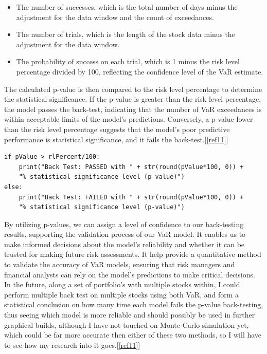 \documentclass{article}
\begin{document}
\begin{itemize}
    \item The number of successes, which is the total number of days minus the adjustment for the data window and the count of exceedances.
    \item The number of trials, which is the length of the stock data minus the adjustment for the data window.
    \item The probability of success on each trial, which is 1 minus the risk level percentage divided by 100, reflecting the confidence level of the VaR estimate.
\end{itemize}

The calculated p-value is then compared to the risk level percentage to determine the statistical significance. If the p-value is greater than the risk level percentage, the model passes the back-test, indicating that the number of VaR exceedances is within acceptable limits of the model's predictions. Conversely, a p-value lower than the risk level percentage suggests that the model's poor predictive performance is statistical significance, and it fails the back-test.[\ref{ref11}]

\begin{verbatim}
if pValue > rlPercent/100:
    print("Back Test: PASSED with " + str(round(pValue*100, 0)) + 
    "% statistical significance level (p-value)")
else:
    print("Back Test: FAILED with " + str(round(pValue*100, 0)) + 
    "% statistical significance level (p-value)")
\end{verbatim}

By utilizing p-values, we can assign a level of confidence to our back-testing results, supporting the validation process of our VaR model. It enables us to make informed decisions about the model's reliability and whether it can be trusted for making future risk assessments. It help provide a quantitative method to validate the accuracy of VaR models, ensuring that risk managers and financial analysts can rely on the model's predictions to make critical decisions. In the future, along a set of portfolio's with multiple stocks within, I could perform multiple back test on multiple stocks using both VaR, and form a statistical conclusion on how many time each model fails the p-value back-testing, thus seeing which model is more reliable and should possibly be used in further graphical builds, although I have not touched on Monte Carlo simulation yet, which could be far more accurate then either of these two methods, so I will have to see how my research into it goes.[\ref{ref11}]
\end{document}
